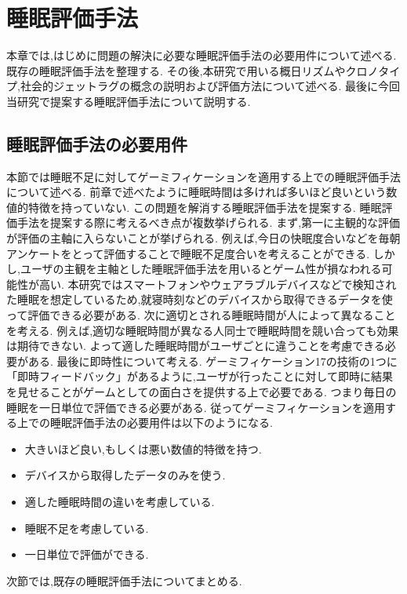 \chapter{睡眠評価手法}
本章では,はじめに問題の解決に必要な睡眠評価手法の必要用件について述べる.
既存の睡眠評価手法を整理する.
その後,本研究で用いる概日リズムやクロノタイプ,社会的ジェットラグの概念の説明および評価方法について述べる.
最後に今回当研究で提案する睡眠評価手法について説明する.

\section{睡眠評価手法の必要用件}
本節では睡眠不足に対してゲーミフィケーションを適用する上での睡眠評価手法について述べる.
前章で述べたように睡眠時間は多ければ多いほど良いという数値的特徴を持っていない.
この問題を解消する睡眠評価手法を提案する.
睡眠評価手法を提案する際に考えるべき点が複数挙げられる.
まず,第一に主観的な評価が評価の主軸に入らないことが挙げられる.
例えば,今日の快眠度合いなどを毎朝アンケートをとって評価することで睡眠不足度合いを考えることができる.
しかし,ユーザの主観を主軸とした睡眠評価手法を用いるとゲーム性が損なわれる可能性が高い.
本研究ではスマートフォンやウェアラブルデバイスなどで検知された睡眠を想定しているため,就寝時刻などのデバイスから取得できるデータを使って評価できる必要がある.
次に適切とされる睡眠時間が人によって異なることを考える.
例えば,適切な睡眠時間が異なる人同士で睡眠時間を競い合っても効果は期待できない.
よって適した睡眠時間がユーザごとに違うことを考慮できる必要がある.
最後に即時性について考える.
ゲーミフィケーション17の技術の1つに「即時フィードバック」があるように,ユーザが行ったことに対して即時に結果を見せることがゲームとしての面白さを提供する上で必要である.
つまり毎日の睡眠を一日単位で評価できる必要がある.
従ってゲーミフィケーションを適用する上での睡眠評価手法の必要用件は以下のようになる.
\begin{itemize}
\renewcommand{\labelenumi}{\arabic{enumi}.}
	\item 大きいほど良い,もしくは悪い数値的特徴を持つ.
	\item デバイスから取得したデータのみを使う.
	\item 適した睡眠時間の違いを考慮している.
	\item 睡眠不足を考慮している.
	\item 一日単位で評価ができる.
\end{itemize}
次節では,既存の睡眠評価手法についてまとめる.

